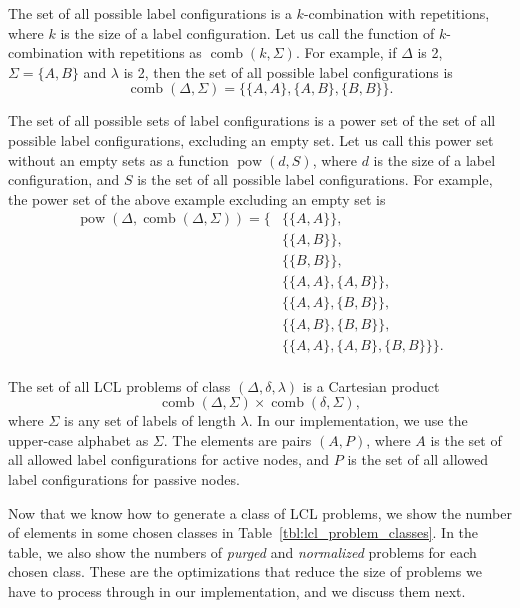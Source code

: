 The set of all possible label configurations is a $k$-combination with repetitions, where $k$ is the size of a label configuration.
Let us call the function of $k$-combination with repetitions as $\operatorname{comb}(k, \Sigma)$.
For example, if $\Delta$ is 2, $\Sigma=\{A, B\}$ and $\lambda$ is 2, then the set of all possible label configurations is
$$ \operatorname{comb}(\Delta, \Sigma) = \{ \{A, A\}, \{A, B\}, \{B, B\} \}. $$

The set of all possible sets of label configurations is a power set of the set of all possible label configurations, excluding an empty set.
Let us call this power set without an empty sets as a function $\operatorname{pow}(d, S)$, where $d$ is the size of a label configuration, and $S$ is the set of all possible label configurations.
For example, the power set of the above example excluding an empty set is
\begin{align*}
  \operatorname{pow}(\Delta, \operatorname{comb}(\Delta, \Sigma)) =  \{&\{\{A, A\}\}, \\
    &\{\{A, B\}\}, \\
    &\{\{B, B\}\}, \\
    &\{\{A, A\}, \{A, B\}\}, \\
    &\{\{A, A\}, \{B, B\}\}, \\
    &\{\{A, B\}, \{B, B\}\}, \\
    &\{\{A, A\}, \{A, B\}, \{B, B\}\} \}.\\
\end{align*}

The set of all LCL problems of class $(\Delta, \delta, \lambda)$ is a Cartesian product
$$ \operatorname{comb}(\Delta, \Sigma) \times \operatorname{comb}(\delta, \Sigma),$$
where $\Sigma$ is any set of labels of length $\lambda$.
In our implementation, we use the upper-case alphabet as $\Sigma$.
The elements are pairs $(A, P)$, where $A$ is the set of all allowed label configurations for active nodes, and $P$ is the set of all allowed label configurations for passive nodes.

Now that we know how to generate a class of LCL problems, we show the number of elements in some chosen classes in Table~\ref{tbl:lcl_problem_classes}.
In the table, we also show the numbers of \emph{purged} and \emph{normalized} problems for each chosen class.
These are the optimizations that reduce the size of problems we have to process through in our implementation, and we discuss them next.

